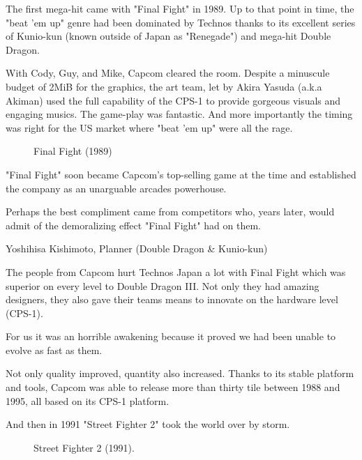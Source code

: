 The first mega-hit came with "Final Fight" in 1989. Up to that point in time, the "beat 'em up" genre had been dominated by Technos thanks to its excellent series of Kunio-kun (known outside of Japan as "Renegade") and mega-hit Double Dragon. 

With Cody, Guy, and Mike, Capcom cleared the room. Despite a minuscule budget of 2MiB for the graphics, the art team, let by Akira Yasuda (a.k.a Akiman) used the full capability of the CPS-1 to provide gorgeous visuals and engaging musics. The game-play was fantastic. And more importantly the timing was right for the US market where "beat 'em up" were all the rage.



  

\label{nin_ff}
 \begin{figure}[H]
\caption*{Final Fight (1989)}
\end{figure}

"Final Fight" soon became Capcom's top-selling game at the time\cite{birth_of_chunli} and established the company as an unarguable arcades powerhouse.

\pagebreak

Perhaps the best compliment came from competitors who, years later, would admit of the demoralizing effect "Final Fight" had on them.

\begin{q}{Yoshihisa Kishimoto, Planner (Double Dragon \& Kunio-kun)\cite{dd} }
  

  The people from Capcom hurt Technos Japan a lot with Final Fight which was superior on every level to Double Dragon III. Not only they had amazing designers, they also gave their teams means to innovate on the hardware level (CPS-1). 

  For us it was an horrible awakening because it proved we had been unable to evolve as fast as them.
  \end{q}



Not only quality improved, quantity also increased. Thanks to its stable platform and tools, Capcom was able to release more than thirty tile between 1988 and 1995, all based on its CPS-1 platform. 

And then in 1991 "Street Fighter 2" took the world over by storm.

\label{nin_sf2}
\begin{figure}[H]
\caption*{Street Fighter 2 (1991).}
\end{figure}

